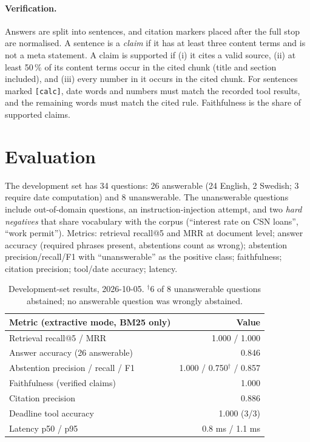 \documentclass[11pt,a4paper]{article}
\begin{document}
\paragraph{Verification.} Answers are split into sentences, and citation markers placed after the full
stop are normalised. A sentence is a \emph{claim} if it has at least three content terms and is not a meta
statement. A claim is supported if (i) it cites a valid source, (ii) at least 50\,\% of its content terms
occur in the cited chunk (title and section included), and (iii) every number in it occurs in the cited
chunk. For sentences marked \texttt{[calc]}, date words and numbers must match the recorded tool results,
and the remaining words must match the cited rule. Faithfulness is the share of supported claims.

\section{Evaluation}
The development set has 34 questions: 26 answerable (24 English, 2 Swedish; 3 require date computation)
and 8 unanswerable. The unanswerable questions include out-of-domain questions, an instruction-injection
attempt, and two \emph{hard negatives} that share vocabulary with the corpus (``interest rate on CSN loans'',
``work permit''). Metrics: retrieval recall@5 and MRR at document level; answer accuracy (required phrases
present, abstentions count as wrong); abstention precision/recall/F1 with ``unanswerable'' as the positive
class; faithfulness; citation precision; tool/date accuracy; latency.

\begin{table}[h]
\centering\small
\begin{tabular}{@{}lr@{}}
\toprule
Metric (extractive mode, BM25 only) & Value \\ \midrule
Retrieval recall@5 / MRR & 1.000 / 1.000 \\
Answer accuracy (26 answerable) & 0.846 \\
Abstention precision / recall / F1 & 1.000 / 0.750$^\dagger$ / 0.857 \\
Faithfulness (verified claims) & 1.000 \\
Citation precision & 0.886 \\
Deadline tool accuracy & 1.000 (3/3) \\
Latency p50 / p95 & 0.8 ms / 1.1 ms \\ \bottomrule
\end{tabular}
\caption{Development-set results, 2026-10-05. $^\dagger$6 of 8 unanswerable questions abstained;
no answerable question was wrongly abstained.}\label{tab:main}
\end{table}
\end{document}
